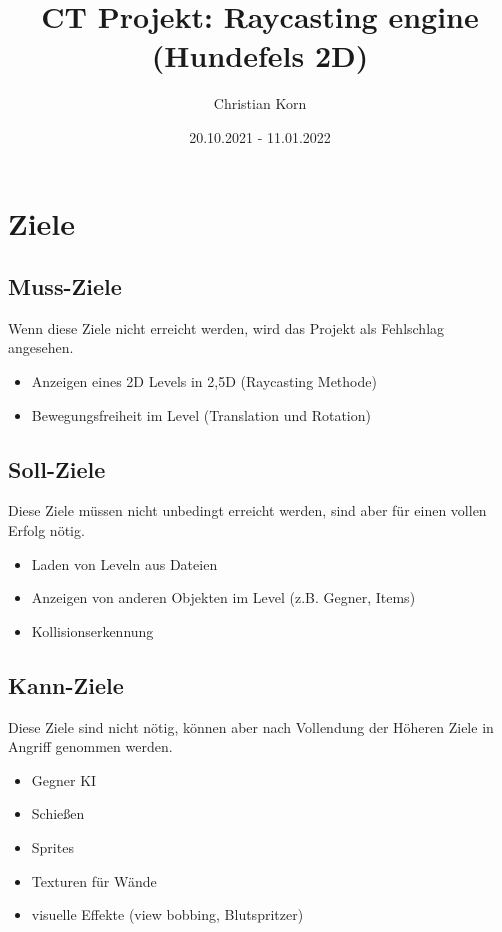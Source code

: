 \documentclass[a4paper,titlepage]{article}
\title{CT Projekt: Raycasting engine (Hundefels 2D)}
\author{Christian Korn}
\date{20.10.2021 - 11.01.2022}
\begin{document}
\maketitle
\tableofcontents

\newpage

\section{Ziele}

\subsection{Muss-Ziele}
Wenn diese Ziele nicht erreicht werden, wird das Projekt als Fehlschlag angesehen.

\begin{itemize}
\item Anzeigen eines 2D Levels in 2,5D (Raycasting Methode) \checkmark
\item Bewegungsfreiheit im Level (Translation und Rotation) \checkmark
\end{itemize}

\subsection{Soll-Ziele}
Diese Ziele müssen nicht unbedingt erreicht werden, sind aber für einen vollen Erfolg nötig.

\begin{itemize}
\item Laden von Leveln aus Dateien \checkmark
\item Anzeigen von anderen Objekten im Level (z.B. Gegner, Items) \checkmark
\item Kollisionserkennung \checkmark
\end{itemize}

\subsection{Kann-Ziele}
Diese Ziele sind nicht nötig, können aber nach Vollendung der Höheren Ziele in Angriff genommen werden.

\begin{itemize}
\item Gegner KI
\item Schießen
\item Sprites
\item Texturen für Wände
\item visuelle Effekte (view bobbing, Blutspritzer)
\end{itemize}
\end{document}
